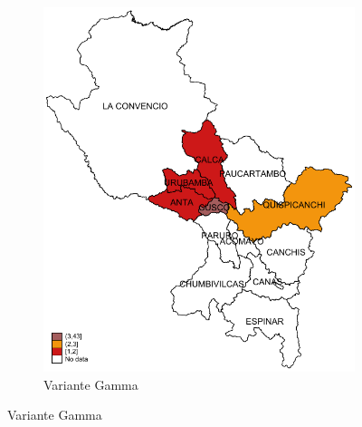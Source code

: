 \documentclass[12pt,a4paper,openany]{book}
\begin{document}
\begin{figure}[h]
\begin{subfigure}[b]{0.40\textwidth}
			\includegraphics[width=\textwidth]{../figuras/variantes_provincial_gamma.pdf}
			\caption{Variante Gamma}
		\end{subfigure}
		

\end{figure}
\end{document}
